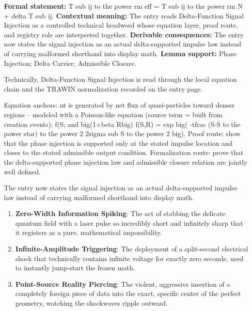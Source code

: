 \begingroup\footnotesize\setlength{\emergencystretch}{3em}\sloppy
\textbf{Formal statement:} T sub ij to the power rm eff = T sub ij to the power rm N + delta T sub ij. \textbf{Contextual meaning:} The entry reads Delta-Function Signal Injection as a controlled technical headword whose equation layer, proof route, and registry role are interpreted together. \textbf{Derivable consequences:} The entry now states the signal injection as an actual delta-supported impulse law instead of carrying malformed shorthand into display math. \textbf{Lemma support:} Phase Injection; Delta Carrier; Admissible Closure.\par
\endgroup

Technically, Delta-Function Signal Injection is read through the local equation chain and the TRAWIN normalization recorded on the entry page.

Equation anchors: nt is generated by net flux of quasi-particles toward denser regions -- modeled with a Poisson-like equation (source term = built from creation events); f(S; and big(1+beta Rbig) f(S,R) = exp big( -tfrac (S-S to the power star) to the power 2 2sigma sub S to the power 2 big). Proof route: show that the phase injection is supported only at the stated impulse location and closes to the stated admissible output condition. Formalization route: prove that the delta-supported phase injection law and admissible closure relation are jointly well defined.

The entry now states the signal injection as an actual delta-supported impulse law instead of carrying malformed shorthand into display math.
\endgroup

\begin{enumerate}[leftmargin=1.6em,itemsep=6pt,topsep=4pt]
\item \textbf{Zero-Width Information Spiking}: The act of stabbing the delicate quantum field with a laser pulse so incredibly short and infinitely sharp that it registers as a pure, mathematical impossibility.
\item \textbf{Infinite-Amplitude Triggering}: The deployment of a split-second electrical shock that technically contains infinite voltage for exactly zero seconds, used to instantly jump-start the frozen math.
\item \textbf{Point-Source Reality Piercing}: The violent, aggressive insertion of a completely foreign piece of data into the exact, specific center of the perfect geometry, watching the shockwaves ripple outward.
\end{enumerate}

